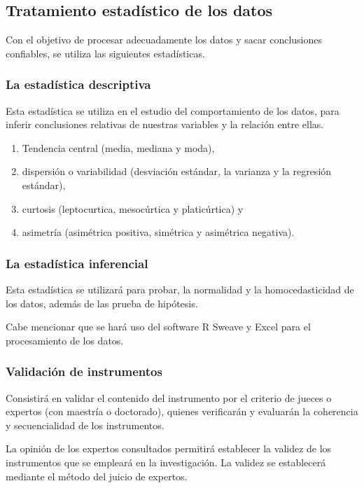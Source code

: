 \documentclass[12pt,a4paper]{article}
\begin{document}
\subsection{Tratamiento estadístico de los datos}
Con el objetivo de procesar adecuadamente los datos y sacar conclusiones confiables, se utiliza  las siguientes estadísticas.
 
\subsubsection{La estadística descriptiva} Esta estadística se utiliza en el estudio  del comportamiento de los datos, para inferir conclusiones relativas de nuestras variables y la relación entre ellas.  

\begin{enumerate}
\item Tendencia central (media, mediana y moda),
\item dispersión o variabilidad (desviación estándar, la varianza y la regresión estándar),
\item curtosis (leptocurtica, mesocúrtica y platicúrtica) y 
\item asimetría (asimétrica positiva, simétrica y asimétrica negativa).
\end{enumerate}

\subsubsection{La estadística inferencial} Esta estadística se utilizará para probar, la normalidad y la homocedasticidad  de los datos, además de las prueba de hipótesis.

Cabe mencionar que se hará uso del software R Sweave y Excel para el procesamiento de los datos.

\subsubsection{Validación de instrumentos}
Consistirá en validar el contenido del instrumento por el criterio de jueces o expertos (con maestría o doctorado), quienes verificarán y evaluarán la coherencia y secuencialidad de los instrumentos.



La opinión de los expertos consultados permitirá establecer la validez de los instrumentos que se empleará en la investigación. La validez se establecerá mediante el método del juicio de expertos.
\end{document}
